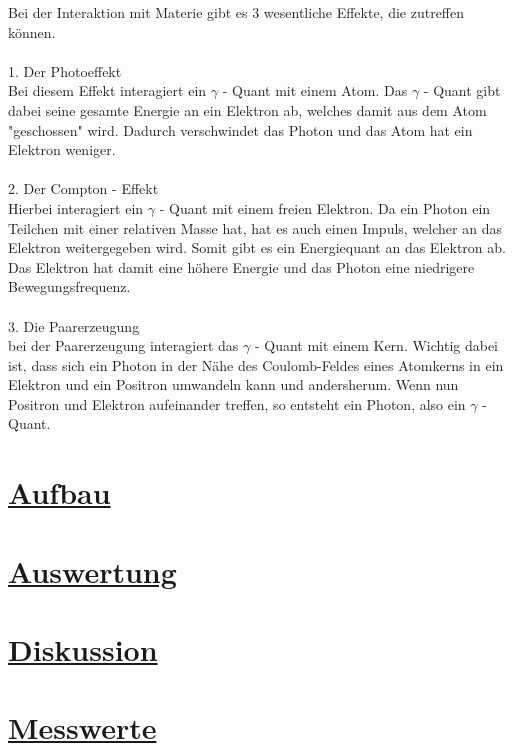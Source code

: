 \documentclass[11pt,a4paper]{article}
\begin{document}
Bei der Interaktion mit Materie gibt es 3 wesentliche Effekte, die zutreffen können.
\\\\
1. Der Photoeffekt \\
Bei diesem Effekt interagiert ein $\gamma$ - Quant mit einem Atom. Das $\gamma$ -
Quant gibt dabei seine gesamte Energie an ein Elektron ab, welches damit aus dem Atom
"geschossen" wird. Dadurch verschwindet das Photon und das Atom hat ein Elektron
weniger.
\\\\
2. Der Compton - Effekt \\
Hierbei interagiert ein $\gamma$ - Quant mit einem freien Elektron. Da ein Photon ein
Teilchen mit einer relativen Masse hat, hat es auch einen Impuls, welcher an das
Elektron weitergegeben wird. Somit gibt es ein Energiequant an das Elektron ab. Das
Elektron hat damit eine höhere Energie und das Photon eine niedrigere
Bewegungsfrequenz.
\\\\
3. Die Paarerzeugung \\
bei der Paarerzeugung interagiert das $\gamma$ - Quant mit einem Kern. Wichtig dabei
ist, dass sich ein Photon in der Nähe des Coulomb-Feldes eines Atomkerns in ein
Elektron und ein Positron umwandeln kann und andersherum. Wenn nun Positron und
Elektron aufeinander treffen, so entsteht ein Photon, also ein $\gamma$ - Quant.
\newpage
\section{\underline{Aufbau}}
\newpage
\section{\underline{Auswertung}}
\newpage
\section{\underline{Diskussion}}
\newpage
\section{\underline{Messwerte}}
 
\end{document}
